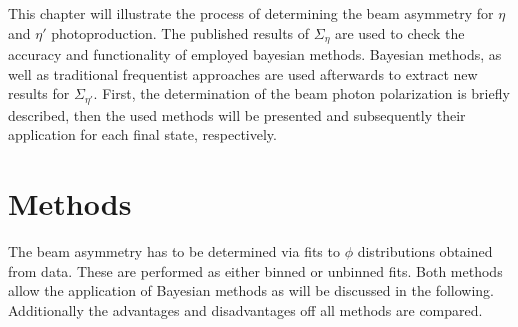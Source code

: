 This chapter will illustrate the process of determining the beam asymmetry for $\eta$ and $\eta'$ photoproduction. The published results of $\Sigma_{\eta}$ \cite{farahphd,eta} are used to check the accuracy and functionality of employed bayesian methods. Bayesian methods, as well as traditional frequentist approaches are used afterwards to extract new results for $\Sigma_{\eta'}$. First, the determination of the beam photon polarization is briefly described, then the used methods will be presented and subsequently their application for each final state, respectively.
\section{Methods}
\label{sec:meth}
The beam asymmetry has to be determined via fits to $\phi$ distributions obtained from data. These are performed as either binned or unbinned fits. Both methods allow the application of Bayesian methods as will be discussed in the following. Additionally the advantages and disadvantages off all methods are compared.
